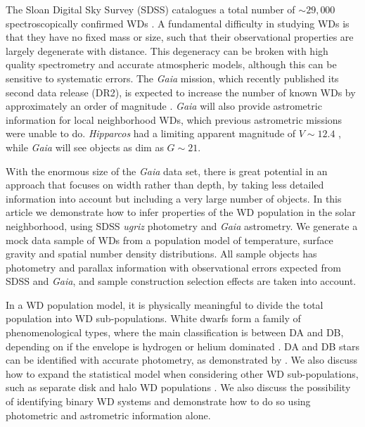 \documentclass[fleqn,usenatbib]{mnras}
\begin{document}
The Sloan Digital Sky Survey (SDSS) catalogues a total number of $\sim 29,000$ spectroscopically confirmed WDs \citep{2013ApJS..204....5K,2015MNRAS.446.4078K}. A fundamental difficulty in studying WDs is that they have no fixed mass or size, such that their observational properties are largely degenerate with distance. This degeneracy can be broken with high quality spectrometry and accurate atmospheric models, although this can be sensitive to systematic errors. The \emph{Gaia} mission, which recently published its second data release (DR2), is expected to increase the number of known WDs by approximately an order of magnitude \citep{2014A&A...565A..11C,Jordan:2006jg}. \emph{Gaia} will also provide astrometric information for local neighborhood WDs, which previous astrometric missions were unable to do. \emph{Hipparcos} had a limiting apparent magnitude of $V \sim 12.4$ \citep{1997A&A...323L..49P}, while \emph{Gaia} will see objects as dim as $G \sim 21$.

With the enormous size of the \emph{Gaia} data set, there is great potential in an approach that focuses on width rather than depth, by taking less detailed information into account but including a very large number of objects. In this article we demonstrate how to infer properties of the WD population in the solar neighborhood, using SDSS \emph{ugriz} photometry and \emph{Gaia} astrometry. We generate a mock data sample of WDs from a population model of temperature, surface gravity and spatial number density distributions. All sample objects has photometry and parallax information with observational errors expected from SDSS and \emph{Gaia}, and sample construction selection effects are taken into account.

In a WD population model, it is physically meaningful to divide the total population into WD sub-populations. White dwarfs form a family of phenomenological types, where the main classification is between DA and DB, depending on if the envelope is hydrogen or helium dominated \citep{Tremblay:2007hq,2011ApJ...737...28B,2015A&A...583A..86K}. DA and DB stars can be identified with accurate photometry, as demonstrated by \cite{Mortlock:2008gf}. We also discuss how to expand the statistical model when considering other WD sub-populations, such as separate disk and halo WD populations \citep{1998ApJ...503..239I,2016MNRAS.463.2453D}. We also discuss the possibility of identifying binary WD systems \citep{2018MNRAS.476.2584M} and demonstrate how to do so using photometric and astrometric information alone.
\end{document}
